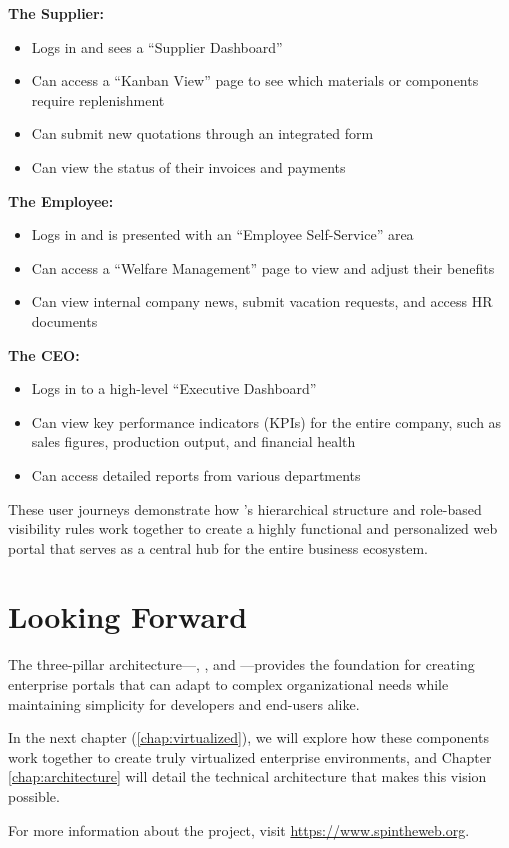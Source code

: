 \textbf{The Supplier:}
\begin{itemize}
    \item Logs in and sees a ``Supplier Dashboard''
    \item Can access a ``Kanban View'' page to see which materials or components require replenishment
    \item Can submit new quotations through an integrated form
    \item Can view the status of their invoices and payments
\end{itemize}

\textbf{The Employee:}
\begin{itemize}
    \item Logs in and is presented with an ``Employee Self-Service'' area
    \item Can access a ``Welfare Management'' page to view and adjust their benefits
    \item Can view internal company news, submit vacation requests, and access HR documents
\end{itemize}

\textbf{The CEO:}
\begin{itemize}
    \item Logs in to a high-level ``Executive Dashboard''
    \item Can view key performance indicators (KPIs) for the entire company, such as sales figures, production output, and financial health
    \item Can access detailed reports from various departments
\end{itemize}

These user journeys demonstrate how \wbdl{}'s hierarchical structure and role-based visibility rules work together to create a highly functional and personalized web portal that serves as a central hub for the entire business ecosystem.

\section{Looking Forward}
\label{sec:looking-forward}

The three-pillar architecture—\wbdl{}, \webspinner{}, and \studio{}—provides the foundation for creating enterprise portals that can adapt to complex organizational needs while maintaining simplicity for developers and end-users alike.

In the next chapter (\cref{chap:virtualized}), we will explore how these components work together to create truly virtualized enterprise environments, and Chapter \ref{chap:architecture} will detail the technical architecture that makes this vision possible.

For more information about the project, visit \url{https://www.spintheweb.org}.

